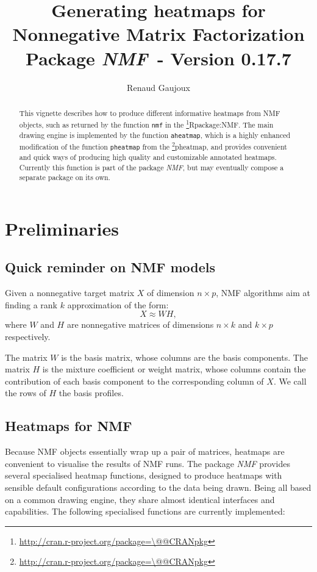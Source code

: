 \documentclass[a4paper]{article}\usepackage{graphicx, color}
\makeatletter
\let\code=\texttt
\newcommand{\pkgname}[1]{\textit{#1}\xspace}
\newcommand{\CRANurl}[1]{\url{http://cran.r-project.org/package=#1}}
\def\CRANpkg{\@ifstar\@CRANpkg\@@CRANpkg}
\def\@CRANpkg#1{\href{http://cran.r-project.org/package=#1}{\pkgname{#1}}\footnote{\CRANurl{#1}}}
\def\@@CRANpkg#1{\href{http://cran.r-project.org/package=#1}{\pkgname{#1}} package\footnote{\CRANurl{#1}}}
\def\citeCRANpkg{\@ifstar\@citeCRANpkg\@@citeCRANpkg}
\def\@citeCRANpkg#1{\CRANpkg{#1}\cite*{Rpackage:#1}}
\def\@@citeCRANpkg#1{\CRANpkg{#1}~\cite{Rpackage:#1}}
\newcommand{\nmfpack}{\pkgname{NMF}}
\renewcommand{\cite}[1]{\parencite{#1}}
\makeatother
\begin{document}
\title{Generating heatmaps for Nonnegative Matrix Factorization\\
\small Package \nmfpack\ - Version 0.17.7}
\author{Renaud Gaujoux}

\maketitle

\begin{abstract}
This vignette describes how to produce different informative heatmaps from NMF objects, 
such as returned by the function \code{nmf} in the \citeCRANpkg{NMF}.
The main drawing engine is implemented by the function \code{aheatmap}, which is 
a highly enhanced modification of the function \code{pheatmap} from the \CRANpkg{pheatmap},
and provides convenient and quick ways of producing high quality and customizable annotated heatmaps.
Currently this function is part of the package \nmfpack, but may eventually 
compose a separate package on its own.
\end{abstract}

{\small \tableofcontents}

\section{Preliminaries}

\subsection{Quick reminder on NMF models}

Given a nonnegative target matrix $X$ of dimension $n\times p$, NMF algorithms 
aim at finding a rank $k$ approximation of the form:
$$
X \approx W H,
$$
where $W$ and $H$ are nonnegative matrices of dimensions $n\times k$ and $k\times p$ 
respectively.

The matrix $W$ is the basis matrix, whose columns are the basis components.
The matrix $H$ is the mixture coefficient or weight matrix, whose columns contain 
the contribution of each basis component to the corresponding column of $X$.
We call the rows of $H$ the basis profiles.

\subsection{Heatmaps for NMF}

Because NMF objects essentially wrap up a pair of matrices, heatmaps are convenient 
to visualise the results of NMF runs. 
The package \nmfpack provides several specialised heatmap functions, designed to produce 
heatmaps with sensible default configurations according to the data being drawn.
Being all based on a common drawing engine, they share almost identical interfaces 
and capabilities.
The following specialised functions are currently implemented:
\end{document}
